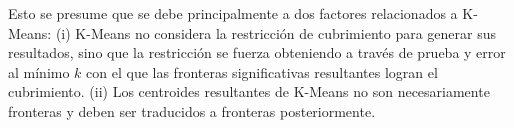 

Esto se presume que se debe principalmente a dos factores relacionados a
K-Means: (i) K-Means no considera la restricción de cubrimiento para generar
sus resultados, sino que la restricción se fuerza obteniendo a través de prueba
y error al mínimo $k$ con el que las fronteras significativas resultantes
logran el cubrimiento. (ii) Los centroides resultantes de K-Means no son
necesariamente fronteras y deben ser traducidos a fronteras posteriormente.





